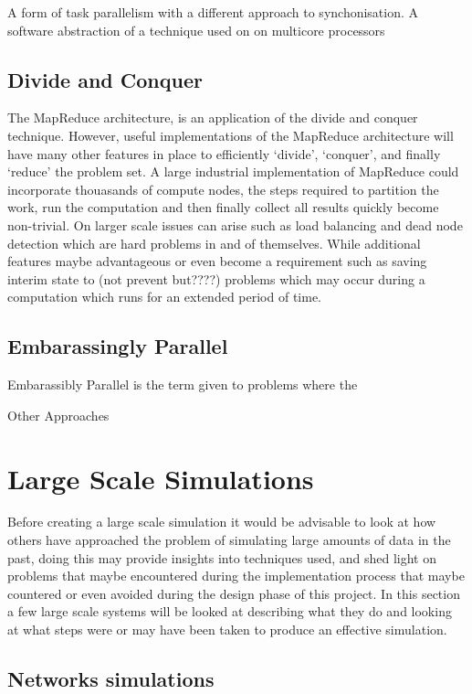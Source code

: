 \documentclass[main.tex]{subfiles}
\begin{document}
{{A form of task parallelism with a different approach to synchonisation.
A software abstraction of a technique used on on multicore processors

\subsection{Divide and Conquer}

The MapReduce architecture, is an application of the divide and conquer technique. However, useful implementations of the MapReduce architecture will have many other features in place to efficiently `divide', `conquer', and finally `reduce' the problem set. A large industrial implementation of MapReduce could incorporate thouasands of compute nodes, the steps required to partition the work, run the computation and then finally collect all results quickly become non-trivial. On larger scale issues can arise such as load balancing and dead node detection which are hard problems in and of themselves. While additional features maybe advantageous or even become a requirement such as saving interim state to (not prevent but????) problems which may occur during a computation which runs for an extended period of time.

\subsection{Embarassingly Parallel}

Embarassibly Parallel is the term given to problems where the

Other Approaches

\section{Large Scale Simulations}

Before creating a large scale simulation it would be advisable to look at how others have approached the problem of simulating large amounts of data in the past, doing this may provide insights into techniques used, and shed light on problems that maybe encountered during the implementation process that maybe countered or even avoided during the design phase of this project. In this section a few large scale systems will be looked at describing what they do and looking at what steps were or may have been taken to produce an effective simulation.

\subsection{Networks simulations}

}}
\end{document}
